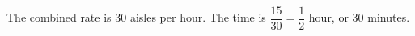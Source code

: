 The combined rate is $30$ aisles per hour. The time is $\dfrac{15}{30}=\dfrac{1}{2}$ hour, or $\boxed{30}$ minutes.
